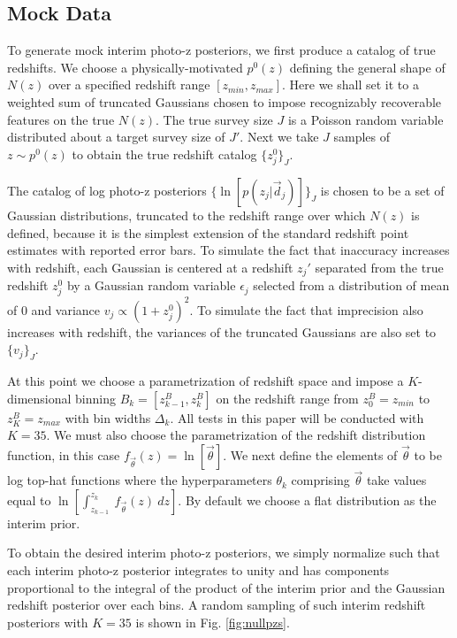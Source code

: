 \documentclass[preprint]{aastex}
\begin{document}
\subsection{Mock Data}
\label{sec:mock}

To generate mock interim photo-z posteriors, we first produce a catalog of true 
redshifts.  We choose a physically-motivated $p^{0}(z)$ defining the general 
shape of $N(z)$ over a specified redshift range $[z_{min},z_{max}]$.  Here we 
shall set it to a weighted sum of truncated Gaussians chosen to impose 
recognizably recoverable features on the true $N(z)$.  The true survey size $J$ 
is a Poisson random variable distributed about a target survey size of $J'$.  
Next we take $J$ samples of $z\sim p^{0}(z)$ to obtain the true redshift 
catalog $\{z_{j}^{0}\}_{J}$.  

The catalog of log photo-z posteriors $\{\ln[p(z_{j}|\vec{d}_{j})]\}_{J}$ is 
chosen to be a set of Gaussian distributions, truncated to the redshift range 
over which $N(z)$ is defined, because it is the simplest extension of the 
standard redshift point estimates with reported error bars.  To simulate the 
fact that inaccuracy increases with redshift, each Gaussian is centered at a 
redshift $z_{j}'$ separated from the true redshift $z_{j}^{0}$ by a Gaussian 
random variable $\epsilon_{j}$ selected from a distribution of mean of 0 and 
variance $v_{j}\propto(1+z_{j}^{0})^{2}$.  To simulate the fact that 
imprecision also increases with redshift, the variances of the truncated 
Gaussians are also set to $\{v_{j}\}_{J}$.

At this point we choose a parametrization of redshift space and impose a 
$K$-dimensional binning $B_{k}=[z^{B}_{k-1},z^{B}_{k}]$ on the redshift range 
from $z^{B}_{0}=z_{min}$ to $z^{B}_{K}=z_{max}$ with bin widths $\Delta_{k}$.  
All tests in this paper will be conducted with $K=35$.  We must also choose the 
parametrization of the redshift distribution function, in this case 
$f_{\vec{\theta}}(z)=\ln[\vec{\theta}]$.  We next define the elements of 
$\vec{\theta}$ to be log top-hat functions where the hyperparameters 
$\theta_{k}$ comprising $\vec{\theta}$ take values equal to 
$\ln[\int_{z_{k-1}}^{z_{k}}\ f_{\vec{\theta}}(z)\ dz]$.  By default we choose a 
flat distribution as the interim prior.

To obtain the desired interim photo-z posteriors, we simply normalize such that 
each interim photo-z posterior integrates to unity and has components 
proportional to the integral of the product of the interim prior and the 
Gaussian redshift posterior over each bins.  A random sampling of such interim 
redshift posteriors with $K=35$ is shown in Fig. \ref{fig:nullpzs}.
\end{document}
